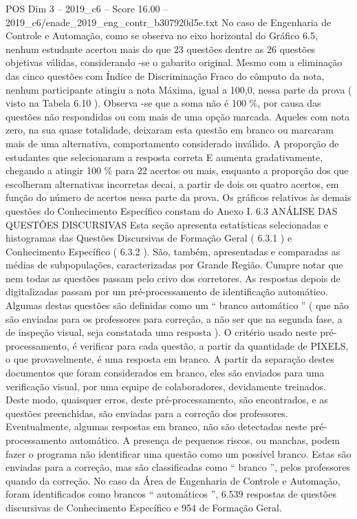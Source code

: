 \begin{textsample}{POS Dim 3 – 2019\_c6 – Score 16.00 – 2019\_c6/enade\_2019\_eng\_contr\_b307920d5e.txt}
No caso de Engenharia de Controle e Automação, como se observa no eixo horizontal do Gráfico 6.5, nenhum estudante acertou mais do que 23 questões dentre as 26 questões objetivas válidas, considerando -se o gabarito original.
Mesmo com a eliminação das cinco questões com Índice de Discriminação Fraco do cômputo da nota, nenhum participante atingiu a nota Máxima, igual a 100,0, nessa parte da prova ( visto na Tabela 6.10 ).
Observa -se que a soma não é 100 \%, por causa das questões não respondidas ou com mais de uma opção marcada.
Aqueles com nota zero, na sua quase totalidade, deixaram esta questão em branco ou marcaram mais de uma alternativa, comportamento considerado inválido.
A proporção de estudantes que selecionaram a resposta correta E aumenta gradativamente, chegando a atingir 100 \% para 22 acertos ou mais, enquanto a proporção dos que escolheram alternativas incorretas decai, a partir de dois ou quatro acertos, em função do número de acertos nessa parte da prova.
Os gráficos relativos às demais questões do Conhecimento Específico constam do Anexo I. 6.3 ANÁLISE DAS QUESTÕES DISCURSIVAS Esta seção apresenta estatísticas selecionadas e histogramas das Questões Discursivas de Formação Geral ( 6.3.1 ) e Conhecimento Específico ( 6.3.2 ).
São, também, apresentadas e comparadas as médias de subpopulações, caracterizadas por Grande Região.
Cumpre notar que nem todas as questões passam pelo crivo dos corretores.
As respostas depois de digitalizadas passam por um pré-processamento de identificação automático.
Algumas destas questões são definidas como um “ branco automático ” ( que não são enviadas para os professores para correção, a não ser que na segunda fase, a de inspeção visual, seja constatada uma resposta ).
O critério usado neste pré-processamento, é verificar para cada questão, a partir da quantidade de PIXELS, o que provavelmente, é uma resposta em branco.
A partir da separação destes documentos que foram considerados em branco, eles são enviados para uma verificação visual, por uma equipe de colaboradores, devidamente treinados.
Deste modo, quaisquer erros, deste pré-processamento, são encontrados, e as questões preenchidas, são enviadas para a correção dos professores.
Eventualmente, algumas respostas em branco, não são detectadas neste pré-processamento automático.
A presença de pequenos riscos, ou manchas, podem fazer o programa não identificar uma questão como um possível branco.
Estas são enviadas para a correção, mas são classificadas como “ branco ”, pelos professores quando da correção.
No caso da Área de Engenharia de Controle e Automação, foram identificados como brancos “ automáticos ”, 6.539 respostas de questões discursivas de Conhecimento Específico e 954 de Formação Geral.

\end{textsample}
